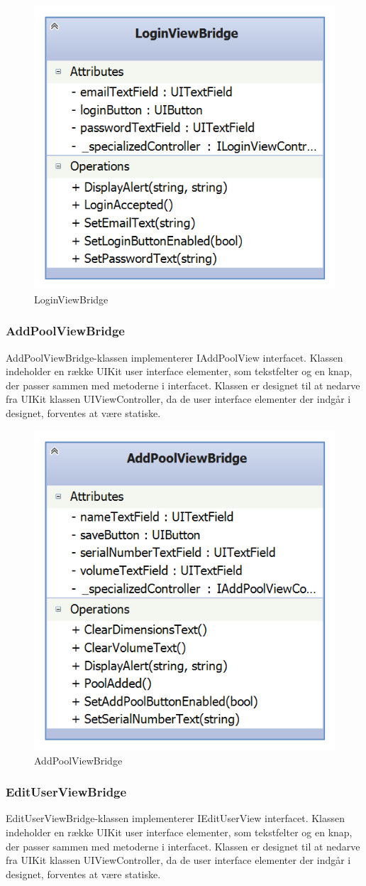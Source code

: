 \begin{figure}
	\centering
	\includegraphics[width=0.3\linewidth]{figs/design/ios_loginviewbridge}
	\caption{LoginViewBridge}
	\label{fig:ios_loginviewbridge}
\end{figure}

\subsubsection{AddPoolViewBridge}
AddPoolViewBridge-klassen implementerer IAddPoolView interfacet. Klassen indeholder en række UIKit user interface elementer, som tekstfelter og en knap, der passer sammen med metoderne i interfacet. Klassen er designet til at nedarve fra UIKit klassen UIViewController, da de user interface elementer der indgår i designet, forventes at være statiske.

\begin{figure}
	\centering
	\includegraphics[width=0.3\linewidth]{figs/design/ios_addpoolviewbridge}
	\caption{AddPoolViewBridge}
	\label{fig:ios_addpoolviewbridge}
\end{figure}

\subsubsection{EditUserViewBridge}
EditUserViewBridge-klassen implementerer IEditUserView interfacet. Klassen indeholder en række UIKit user interface elementer, som tekstfelter og en knap, der passer sammen med metoderne i interfacet. Klassen er designet til at nedarve fra UIKit klassen UIViewController, da de user interface elementer der indgår i designet, forventes at være statiske.

